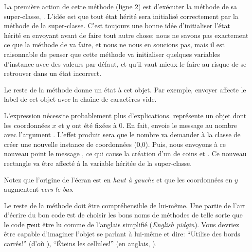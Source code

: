 \documentclass[a4paper,10pt,twoside]{book}
\begin{document}
La première action de cette méthode (ligne 2) est d'exécuter la méthode  de sa super-classe, .
L'idée est que tout état hérité sera initialisé correctement par la méthode  de la super-classe.
C'est toujours une bonne idée d'initialiser l'état hérité en envoyant
 avant de faire tout autre chose; nous ne savons
pas exactement ce que la méthode  de
 va faire, et nous ne nous en soucions pas, mais
il est raisonnable de penser que cette méthode va initialiser quelques
variables d'instance avec des valeurs par défaut, et qu'il vaut mieux
le faire au risque de se retrouver dans un état incorrect.

Le reste de la méthode donne un état à cet objet.
Par exemple, envoyer  affecte le label de cet objet avec la chaîne de caractères vide.

L'expression  nécessite probablement plus d'explications.
 représente un objet  dont les coordonnées $x$ et $y$ ont été fixées à 0.
En fait,  envoie le message  au
nombre  avec l'argument .
L'effet produit sera que le nombre  va demander à la classe  de créer une nouvelle instance de coordonnées (0,0).
Puis, nous envoyons à ce nouveau point le message , ce qui cause la création d'un  de coins  et .
Ce nouveau rectangle va être affecté à la variable  héritée de la super-classe.

Notez que l'origine de l'écran \pharo est en \emph{haut à gauche} et que les coordonnées en $y$ augmentent \emph{vers le bas}.

Le reste de la méthode doit être compréhensible de lui-même.
Une partie de l'art d'écrire du bon code \st est de choisir les bons
noms de méthodes de telle sorte que le code \st peut être lu comme
de l'anglais simplifié (\emph{English pidgin}).  
Vous devriez être capable d'imaginer l'objet se parlant à lui-même et
dire:  ``Utilise des bords carrés!'' (d'où \mbox{),}
``Éteins les cellules!'' (en anglais, ).
\end{document}
